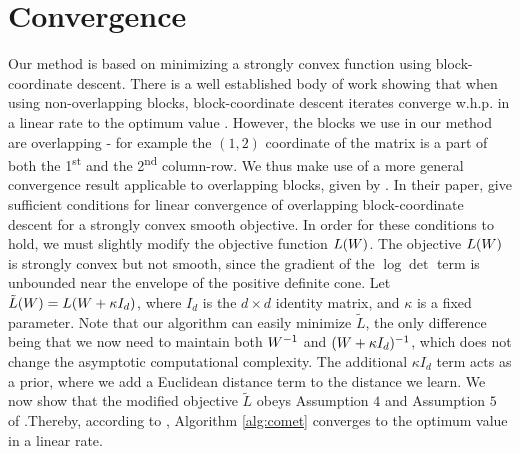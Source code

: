 \documentclass{article}
\begin{document}
\section{Convergence}
Our method is based on minimizing a strongly convex function using
block-coordinate descent. There is a well established body of work
showing that when using non-overlapping blocks, block-coordinate
descent iterates converge w.h.p. in a linear rate to the optimum value
\cite{nesterov2012efficiency,richtarik2014iteration}.  However, the
blocks we use in our method are overlapping - for example the $(1,2)$
coordinate of the matrix is a part of both the 1\textsuperscript{st}
and the 2\textsuperscript{nd} column-row. We thus make use of a more
general convergence result applicable to overlapping blocks, given by
\citet{richtarik2013optimal}.  In their paper,
\citet{richtarik2013optimal} give sufficient conditions for linear
convergence of overlapping block-coordinate descent for a strongly
convex smooth objective.  In order for these conditions to hold, we
must slightly modify the objective function $L({{W}})$. The objective
$L({W})$ is strongly convex but not smooth, since the gradient of the
$\log \det$ term is unbounded near the envelope of the positive
definite cone. Let $\tilde{L}({{W}}) = L({{W} + \kappa I_d})$, where
$I_d$ is the $d \times d$ identity matrix, and $\kappa$ is a fixed
parameter.  Note that our algorithm can easily minimize $\tilde{L}$,
the only difference being that we now need to maintain both ${W}^{-1}$
and $({W}+\kappa I_d)^{-1}$, which does not change the asymptotic
computational complexity. The additional $\kappa I_d$ term acts as a
prior, where we add a Euclidean distance term to the distance we
learn.  We now show that the modified objective $\tilde{L}$ obeys
Assumption $4$ and Assumption $5$ of
\citet{richtarik2013optimal}.Thereby, according to \citet[Theorems 3
and 7]{richtarik2013optimal}, Algorithm \ref{alg:comet} converges to
the optimum value in a linear rate.
\end{document}
